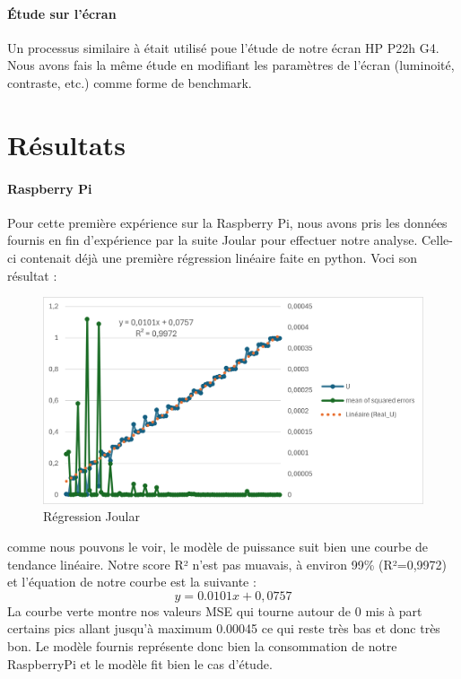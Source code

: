 \documentclass[12pt, a4paper]{report}
\begin{document}
\subsubsection{Étude sur l'écran}
Un processus similaire à était utilisé poue l'étude de notre écran HP P22h G4. Nous avons fais la même étude en modifiant les paramètres de l'écran (luminoité, contraste, etc.) comme forme de benchmark. 

\chapter{\centering Résultats}

\subsubsection{Raspberry Pi}

Pour cette première expérience sur la Raspberry Pi, nous avons pris les données fournis en fin d'expérience par la suite Joular pour effectuer notre analyse. Celle-ci contenait déjà une première régression linéaire faite en python.
Voci son résultat :
\begin{figure}[H]
    \includegraphics[width=1\linewidth]{res/graph/RPi/measure1.png}
    \caption{Régression Joular}
    \label{fig:reg_joular}
\end{figure}

comme nous pouvons le voir, le modèle de puissance suit bien une courbe de tendance linéaire. Notre score R² n'est pas muavais, à environ 99\% (R²=0,9972) et l'équation de notre courbe est la suivante : 
\begin{equation}
    y=0.0101x+0,0757
    \label{eq:rpi_joular}
\end{equation}
La courbe verte montre nos valeurs MSE qui tourne autour de 0 mis à part certains pics allant jusqu'à maximum 0.00045 ce qui reste très bas et donc très bon. Le modèle fournis représente donc bien la consommation de notre RaspberryPi et le modèle fit bien le cas d'étude.
\end{document}
